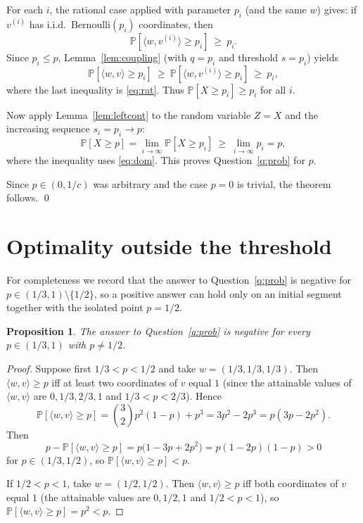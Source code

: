 \documentclass[11pt]{amsart}
\theoremstyle{plain}
\newtheorem{proposition}[theorem]{Proposition}
\def\Pb{\mathbb{P}}
\begin{document}
For each $i$, the rational case applied with parameter $p_i$ (and the same $w$)
gives: if $v^{(i)}$ has i.i.d.\ $\mathrm{Bernoulli}(p_i)$ coordinates, then
\begin{equation}\label{eq:rat}
\Pb[\langle w,v^{(i)}\rangle\ge p_i]\ \ge\ p_i .
\end{equation}
Since $p_i\le p$, Lemma~\ref{lem:coupling} (with $q=p_i$ and threshold $s=p_i$)
yields
\begin{equation}\label{eq:dom}
\Pb[\langle w,v\rangle\ge p_i]\ \ge\ \Pb[\langle w,v^{(i)}\rangle\ge p_i]\ \ge\ p_i ,
\end{equation}
where the last inequality is \eqref{eq:rat}. Thus $\Pb[X\ge p_i]\ge p_i$ for all
$i$.

Now apply Lemma~\ref{lem:leftcont} to the random variable $Z=X$ and the increasing
sequence $s_i=p_i\to p$:
\[
\Pb[X\ge p]=\lim_{i\to\infty}\Pb[X\ge p_i]\ \ge\ \lim_{i\to\infty}p_i=p ,
\]
where the inequality uses \eqref{eq:dom}. This proves Question~\ref{q:prob} for
$p$.

Since $p\in(0,1/c)$ was arbitrary and the case $p=0$ is trivial, the theorem
follows. \qed

\section{Optimality outside the threshold}

For completeness we record that the answer to Question~\ref{q:prob} is negative
for $p\in(1/3,1)\setminus\{1/2\}$, so a positive answer can hold only on an initial
segment together with the isolated point $p=1/2$.

\begin{proposition}\label{prop:counterexample}
The answer to Question~\ref{q:prob} is negative for every $p\in(1/3,1)$ with
$p\ne1/2$.
\end{proposition}

\begin{proof}
Suppose first $1/3<p<1/2$ and take $w=(1/3,1/3,1/3)$. Then
$\langle w,v\rangle\ge p$ iff at least two coordinates of $v$ equal $1$ (since the
attainable values of $\langle w,v\rangle$ are $0,1/3,2/3,1$ and $1/3<p<2/3$).
Hence
\[
\Pb[\langle w,v\rangle\ge p]=\binom{3}{2}p^2(1-p)+p^3=3p^2-2p^3=p(3p-2p^2).
\]
Then
\[
p-\Pb[\langle w,v\rangle\ge p]=p\big(1-3p+2p^2\big)=p(1-2p)(1-p)>0
\]
for $p\in(1/3,1/2)$, so $\Pb[\langle w,v\rangle\ge p]<p$.

If $1/2<p<1$, take $w=(1/2,1/2)$. Then $\langle w,v\rangle\ge p$ iff both
coordinates of $v$ equal $1$ (the attainable values are $0,1/2,1$ and $1/2<p<1$),
so $\Pb[\langle w,v\rangle\ge p]=p^2<p$.
\end{proof}
\end{document}
